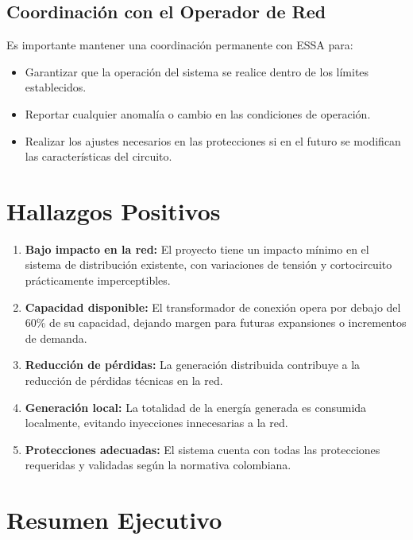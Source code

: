 \subsection{Coordinación con el Operador de Red}

Es importante mantener una coordinación permanente con ESSA para:

\begin{itemize}
    \item Garantizar que la operación del sistema se realice dentro de los límites establecidos.
    
    \item Reportar cualquier anomalía o cambio en las condiciones de operación.
    
    \item Realizar los ajustes necesarios en las protecciones si en el futuro se modifican las características del circuito.
\end{itemize}

\section{Hallazgos Positivos}

\begin{enumerate}
    \item \textbf{Bajo impacto en la red:} El proyecto tiene un impacto mínimo en el sistema de distribución existente, con variaciones de tensión y cortocircuito prácticamente imperceptibles.
    
    \item \textbf{Capacidad disponible:} El transformador de conexión opera por debajo del 60\% de su capacidad, dejando margen para futuras expansiones o incrementos de demanda.
    
    \item \textbf{Reducción de pérdidas:} La generación distribuida contribuye a la reducción de pérdidas técnicas en la red.
    
    \item \textbf{Generación local:} La totalidad de la energía generada es consumida localmente, evitando inyecciones innecesarias a la red.
    
    \item \textbf{Protecciones adecuadas:} El sistema cuenta con todas las protecciones requeridas y validadas según la normativa colombiana.
\end{enumerate}

\section{Resumen Ejecutivo}

